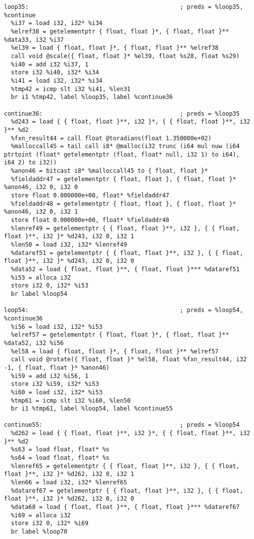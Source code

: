 \documentclass[main.tex]{subfiles}
\begin{document}
{\begin{lstlisting}
loop35:                                           ; preds = %loop35, %continue
  %i37 = load i32, i32* %i34
  %elref38 = getelementptr { float, float }*, { float, float }** %data33, i32 %i37
  %el39 = load { float, float }*, { float, float }** %elref38
  call void @scale({ float, float }* %el39, float %s28, float %s29)
  %i40 = add i32 %i37, 1
  store i32 %i40, i32* %i34
  %i41 = load i32, i32* %i34
  %tmp42 = icmp slt i32 %i41, %len31
  br i1 %tmp42, label %loop35, label %continue36

continue36:                                       ; preds = %loop35
  %d243 = load { { float, float }**, i32 }*, { { float, float }**, i32 }** %d2
  %fxn_result44 = call float @toradians(float 1.350000e+02)
  %malloccall45 = tail call i8* @malloc(i32 trunc (i64 mul nuw (i64 ptrtoint (float* getelementptr (float, float* null, i32 1) to i64), i64 2) to i32))
  %anon46 = bitcast i8* %malloccall45 to { float, float }*
  %fieldaddr47 = getelementptr { float, float }, { float, float }* %anon46, i32 0, i32 0
  store float 0.000000e+00, float* %fieldaddr47
  %fieldaddr48 = getelementptr { float, float }, { float, float }* %anon46, i32 0, i32 1
  store float 0.000000e+00, float* %fieldaddr48
  %lenref49 = getelementptr { { float, float }**, i32 }, { { float, float }**, i32 }* %d243, i32 0, i32 1
  %len50 = load i32, i32* %lenref49
  %dataref51 = getelementptr { { float, float }**, i32 }, { { float, float }**, i32 }* %d243, i32 0, i32 0
  %data52 = load { float, float }**, { float, float }*** %dataref51
  %i53 = alloca i32
  store i32 0, i32* %i53
  br label %loop54

loop54:                                           ; preds = %loop54, %continue36
  %i56 = load i32, i32* %i53
  %elref57 = getelementptr { float, float }*, { float, float }** %data52, i32 %i56
  %el58 = load { float, float }*, { float, float }** %elref57
  call void @rotate({ float, float }* %el58, float %fxn_result44, i32 -1, { float, float }* %anon46)
  %i59 = add i32 %i56, 1
  store i32 %i59, i32* %i53
  %i60 = load i32, i32* %i53
  %tmp61 = icmp slt i32 %i60, %len50
  br i1 %tmp61, label %loop54, label %continue55

continue55:                                       ; preds = %loop54
  %d262 = load { { float, float }**, i32 }*, { { float, float }**, i32 }** %d2
  %s63 = load float, float* %s
  %s64 = load float, float* %s
  %lenref65 = getelementptr { { float, float }**, i32 }, { { float, float }**, i32 }* %d262, i32 0, i32 1
  %len66 = load i32, i32* %lenref65
  %dataref67 = getelementptr { { float, float }**, i32 }, { { float, float }**, i32 }* %d262, i32 0, i32 0
  %data68 = load { float, float }**, { float, float }*** %dataref67
  %i69 = alloca i32
  store i32 0, i32* %i69
  br label %loop70


\end{lstlisting}}
\end{document}
